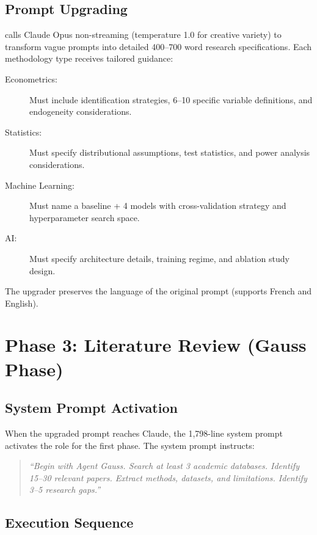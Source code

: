 \subsection{Prompt Upgrading}

 calls Claude Opus non-streaming (temperature 1.0 for creative variety) to transform vague prompts into detailed 400--700 word research specifications.
Each methodology type receives tailored guidance:

\begin{description}
  \item[Econometrics:] Must include identification strategies, 6--10 specific variable definitions, and endogeneity considerations.
  \item[Statistics:] Must specify distributional assumptions, test statistics, and power analysis considerations.
  \item[Machine Learning:] Must name a baseline + 4 models with cross-validation strategy and hyperparameter search space.
  \item[AI:] Must specify architecture details, training regime, and ablation study design.
\end{description}

The upgrader preserves the language of the original prompt (supports French and English).

\section{Phase 3: Literature Review (Gauss Phase)}
\label{sec:pipeline:literature}

\subsection{System Prompt Activation}

When the upgraded prompt reaches Claude, the 1,798-line system prompt activates the \gauss role for the first phase.
The system prompt instructs:

\begin{quote}
\itshape
``Begin with Agent Gauss. Search at least 3 academic databases. Identify 15--30 relevant papers. Extract methods, datasets, and limitations. Identify 3--5 research gaps.''
\end{quote}

\subsection{Execution Sequence}

